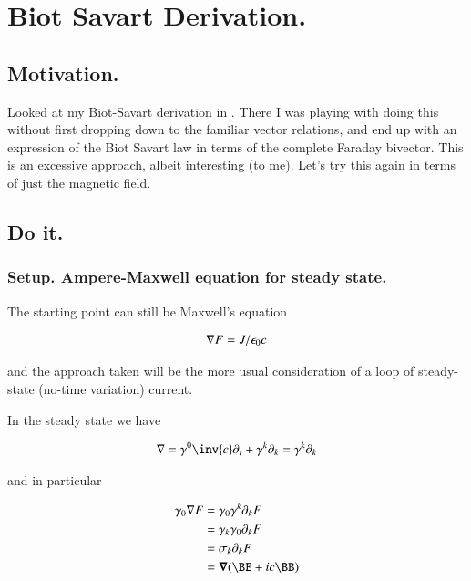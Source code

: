 \chapter{Biot Savart Derivation.}\label{chap:biotSavart}
\date{ April 18, 2009.  $RCSfile: biotSavart.tex,v $ Last $Revision: 1.10 $ $Date: 2009/10/22 02:07:20 $ }

\section{Motivation. }

Looked at my Biot-Savart derivation in .  There I was playing with doing this without first dropping down to the
familiar vector relations, and end up with an expression of the Biot Savart law in terms of the complete Faraday bivector.  This is
an excessive approach, albeit interesting (to me).  Let's try this again in terms of just the magnetic field.

\section{Do it. }

\subsection{Setup. Ampere-Maxwell equation for steady state. }

The starting point can still be Maxwell's equation

\begin{align}
\nabla F = J/\epsilon_0 c
\end{align}

and the approach taken will be the more usual consideration of a loop of steady-state (no-time variation) current.

In the steady state we have

\begin{align*}
\grad = \gamma^0 \inv{c} \partial_t + \gamma^k \partial_k = \gamma^k \partial_k
\end{align*}

and in particular

\begin{align*}
\gamma_0 \grad F
&= \gamma_0 \gamma^k \partial_k F \\
&= \gamma_k \gamma_0 \partial_k F \\
&= \sigma_k \partial_k F \\
&= \spacegrad (\BE + i c \BB) \\
\end{align*}

